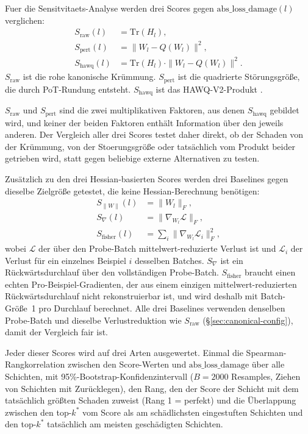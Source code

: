 Fuer die Sensitvitaets-Analyse werden drei Scores gegen $\mathrm{abs\_loss\_damage}(l)$ verglichen:
\begin{align}
S_{\mathrm{raw}}(l) &= \mathrm{Tr}(H_l), \label{eq:s-raw}\\
S_{\mathrm{pert}}(l) &= \|W_l - Q(W_l)\|^2, \label{eq:s-pert}\\
S_{\mathrm{hawq}}(l) &= \mathrm{Tr}(H_l)\cdot\|W_l - Q(W_l)\|^2. \label{eq:s-hawq}
\end{align}
$S_{\mathrm{raw}}$ ist die rohe kanonische Krümmung. $S_{\mathrm{pert}}$ ist die quadrierte Störungsgröße, die durch PoT-Rundung entsteht. $S_{\mathrm{hawq}}$ ist das HAWQ-V2-Produkt \citep{dong_hawqv2_2020}.
\par\medskip

$S_{\mathrm{raw}}$ und $S_{\mathrm{pert}}$ sind die zwei multiplikativen Faktoren, aus denen $S_{\mathrm{hawq}}$ gebildet wird, und keiner der beiden Faktoren enthält Information über den jeweils anderen. Der Vergleich aller drei Scores testet daher direkt, ob der Schaden von der Krümmung, von der Stoerungsgröße oder tatsächlich vom Produkt beider getrieben wird, statt gegen beliebige externe Alternativen zu testen.
\par\medskip

Zusätzlich zu den drei Hessian-basierten Scores werden drei Baselines gegen dieselbe Zielgröße getestet, die keine Hessian-Berechnung benötigen:
\begin{align}
S_{\|W\|}(l) &= \|W_l\|_F, \label{eq:s-weight}\\
S_{\nabla}(l) &= \|\nabla_{W_l}\mathcal{L}\|_F, \label{eq:s-grad}\\
S_{\mathrm{fisher}}(l) &= \sum_i \|\nabla_{W_l}\mathcal{L}_i\|_F^2, \label{eq:s-fisher}
\end{align}
wobei $\mathcal{L}$ der über den Probe-Batch mittelwert-reduzierte Verlust ist und $\mathcal{L}_i$ der Verlust für ein einzelnes Beispiel $i$ desselben Batches. $S_{\nabla}$ ist ein Rückwärtsdurchlauf über den vollständigen Probe-Batch. $S_{\mathrm{fisher}}$ braucht einen echten Pro-Beispiel-Gradienten, der aus einem einzigen mittelwert-reduzierten Rückwärtsdurchlauf nicht rekonstruierbar ist, und wird deshalb mit Batch-Größe~1 pro Durchlauf berechnet. Alle drei Baselines verwenden denselben Probe-Batch und dieselbe Verlustreduktion wie $S_{\mathrm{raw}}$ (\S\ref{sec:canonical-config}), damit der Vergleich fair ist.
\par\medskip

Jeder dieser Scores wird auf drei Arten ausgewertet. Einmal die Spearman-Rangkorrelation zwischen den Score-Werten und $\mathrm{abs\_loss\_damage}$ über alle Schichten, mit 95\%-Bootstrap-Konfidenzintervall ($B=2000$ Resamples, Ziehen von Schichten mit Zurücklegen), den Rang, den der Score der Schicht mit dem tatsächlich größten Schaden zuweist (Rang 1 = perfekt) und die Überlappung zwischen den top-$k^*$ vom Score als am schädlichsten eingestuften Schichten und den top-$k^*$ tatsächlich am meisten geschädigten Schichten.

